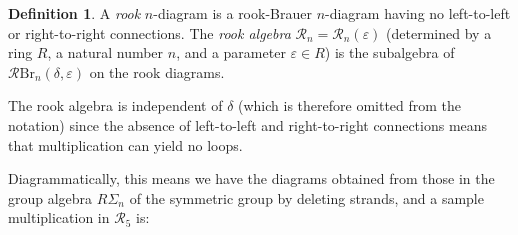 \documentclass[12pt]{amsart}
\theoremstyle{plain}
\theoremstyle{definition} \newtheorem{definition}[theorem]{Definition}
\theoremstyle{plain}
\theoremstyle{plain} \newtheorem{proposition}[theorem]{Proposition}
\theoremstyle{plain} \newtheorem{conjecture}[theorem]{Conjecture}
\theoremstyle{plain} \newtheorem{corollary}[theorem]{Corollary}
\theoremstyle{remark} \newtheorem{claim}[theorem]{Claim}
\theoremstyle{remark} \newtheorem{remark}[theorem]{Remark}
\theoremstyle{remark} \newtheorem{example}[theorem]{Example}
\theoremstyle{remark} \newtheorem{comment}[theorem]{Comment}
\theoremstyle{definition} \newtheorem{question}[theorem]{Question}
\newcommand{\rook}{\mathcal{R}}
\newcommand{\Brauer}{\mathrm{Br}}
\begin{document}
\begin{definition} \label{defRook} A \emph{rook} $n$-diagram is a rook-Brauer $n$-diagram having no left-to-left or right-to-right connections. The \emph{rook algebra} $\rook_n = \rook_n(\varepsilon)$ (determined by a ring $R$, a natural number $n$, and a parameter $\varepsilon \in R$) is the subalgebra of $\rook \Brauer_n(\delta, \varepsilon)$ on the rook diagrams. \end{definition}

The rook algebra is independent of $\delta$ (which is therefore omitted from the notation) since the absence of left-to-left and right-to-right connections means that multiplication can yield no loops.

Diagrammatically, this means we have the diagrams obtained from those in the group algebra $R \Sigma_n$ of the symmetric group by deleting strands, and a sample multiplication in $\rook_5$ is:
\end{document}

